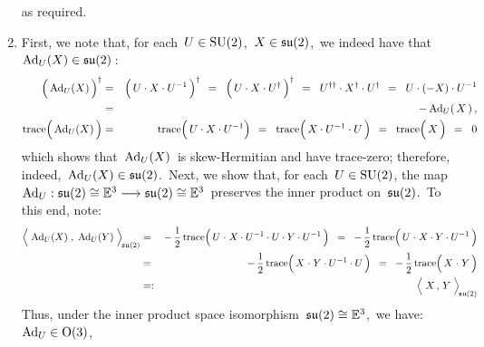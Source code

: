 \begin{enumerate}
	as required.
\item
	First, we note that, for each \,$U \in \textnormal{SU}(2)$,\, $X \in \mathfrak{su}(2)$,\,
	we indeed have that \,$\textnormal{Ad}_{U}(X) \in \mathfrak{su}(2)$\,:
	\begin{eqnarray*}
	\left(\,\textnormal{Ad}_{U}(\overset{{\color{white}.}}{X})\,\right)^{\dagger}
	& = &
		\left(\, U \cdot \overset{{\color{white}.}}{X} \cdot U^{-1} \,\right)^{\dagger}
	\;\, = \;\;
		\left(\, U \cdot \overset{{\color{white}.}}{X} \cdot U^{\dagger} \,\right)^{\dagger}
	\;\, = \;\;
		U^{\dagger\dagger} \cdot X^{\dagger} \cdot U^{\dagger}
	\;\, = \;\;
		U \cdot (-X) \cdot U^{-1}
	\\
	& = &
		- \, \textnormal{Ad}_{U}(\,X\,)\,,
	\\
	\trace\!\left(\,\textnormal{Ad}_{U}(\overset{{\color{white}.}}{X})\,\right)
	& = &
		\trace\!\left(\, U \cdot \overset{{\color{white}.}}{X} \cdot U^{-1}\right)
	\;\, = \;\;
		\trace\!\left(\, \overset{{\color{white}.}}{X} \cdot U^{-1} \cdot U \,\right)
	\;\, = \;\;
		\trace\!\left(\, \overset{{\color{white}.}}{X} \,\right)
	\;\, = \;\;
		0
	\end{eqnarray*}
	which shows that \,$\textnormal{Ad}_{U}(X)$\, is skew-Hermitian and have trace-zero;
	therefore, indeed, \,$\textnormal{Ad}_{U}(X) \in \mathfrak{su}(2)$.\,
	Next, we show that, for each \,$U \in \textnormal{SU}(2)$, the map
	\,$\textnormal{Ad}_{U} : \mathfrak{su}(2) \cong \mathbb{E}^{3}\longrightarrow \mathfrak{su}(2) \cong \mathbb{E}^{3}$\,
	preserves the inner product on \,$\mathfrak{su}(2)$.\,
	To this end, note:
	\begin{eqnarray*}
		\left\langle\;
		\textnormal{Ad}_{U}(\overset{{\color{white}.}}{X})
		\; , \;
		\textnormal{Ad}_{U}(Y)
		\;\right\rangle_{\!\su(2)}
	& = &
		-\,\dfrac{1}{2}\,
		\trace\!\left(\,
				U \overset{{\color{white}1}}{\cdot} X \cdot U^{-1} \cdot U \cdot Y \cdot U^{-1}
			\,\right)
	\;\; = \;\;
		-\,\dfrac{1}{2}\,
		\trace\!\left(\,
			U \overset{{\color{white}1}}{\cdot} X \cdot Y \cdot U^{-1}
			\,\right)
	\\
	& = &
		-\,\dfrac{1}{2}\,
		\trace\!\left(\,
			X \overset{{\color{white}1}}{\cdot} Y \cdot U^{-1} \cdot U
			\,\right)
	\;\; = \;\;
		-\,\dfrac{1}{2}\,
		\trace\!\left(\,
			X \overset{{\color{white}1}}{\cdot} Y
			\,\right)
	\\
	& =: &
		\left\langle\;
			\overset{{\color{white}.}}{X}
			\, , \,
			Y
			\;\right\rangle_{\!\su(2)}
	\end{eqnarray*}
	Thus, under the inner product space isomorphism
	\,$\mathfrak{su}(2) \cong \mathbb{E}^{3}$,\,
	we have:
	\,$\textnormal{Ad}_{U} \in \textnormal{O}(3)$,\,

\end{enumerate}
